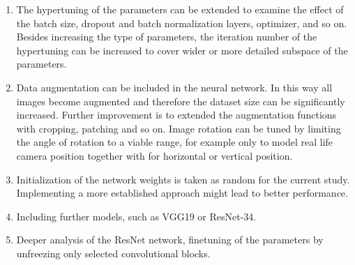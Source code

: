 \documentclass[10pt, final]{article}
\begin{document}
\begin{enumerate}
	\item The hypertuning of the parameters can be extended to examine the effect of the batch size, dropout and batch
	      normalization layers, optimizer, and so on.
	      Besides increasing the type of parameters, the iteration number of the hypertuning can be increased to cover wider
	      or more detailed subspace of the parameters.
	\item Data augmentation can be included in the neural network.
	      In this way all images become augmented and therefore the dataset size can be significantly increased.
	      Further improvement is to extended the augmentation functions with cropping, patching and so on.
	      Image rotation can be tuned by limiting the angle of rotation to a viable range, for example only \textdegree
	      to model real life camera position together with \textdegree for horizontal or vertical position.
	\item Initialization of the network weights is taken as random for the current study.
	      Implementing a more established approach might lead to better performance.
	\item Including further models, such as VGG19 or ResNet-34.
	\item Deeper analysis of the ResNet network, finetuning of the parameters by unfreezing only selected convolutional blocks.
\end{enumerate}

\newpage
\listoffigures
\listoftables
\newpage
\printbibliography
\end{document}
